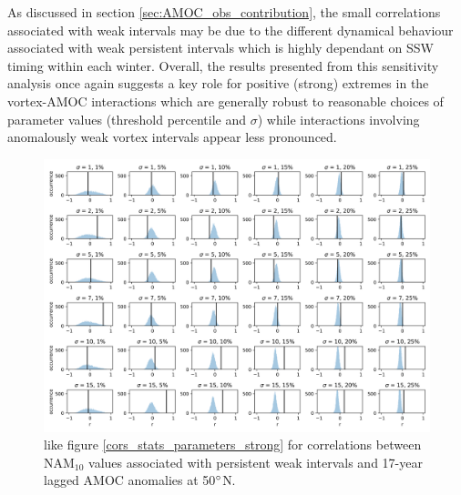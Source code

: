 As discussed in section \ref{sec:AMOC_obs_contribution}, the small correlations associated with weak intervals may be due to the different dynamical behaviour associated with weak persistent intervals which is highly dependant on SSW timing within each winter. Overall, the results presented from this sensitivity analysis once again suggests a key role for positive (strong) extremes in the vortex-AMOC interactions which are generally robust to reasonable choices of parameter values (threshold percentile and $\sigma$) while interactions involving anomalously weak vortex intervals appear less pronounced. 

\newpage
\begin{landscape}
\begin{figure}[h!]
\begin{center}
\noindent\includegraphics[width =0.9\linewidth]{Figures/Figures-surface/cors_sigs_thresh_and_sigma_weak.png} 
\caption[PDFs for weak NAM$_{10}$ extreme vs AMOC for different $\sigma$/threshold]{like figure \ref{cors_stats_parameters_strong} for correlations between NAM$_{10}$ values associated with persistent weak intervals and 17-year lagged AMOC anomalies at 50$\degree$N.}
\label{cors_stats_parameters_weak}
\end{center}
\end{figure}
\end{landscape}


